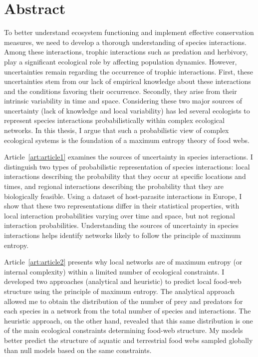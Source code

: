\documentclass[12pt,twoside,phd]{dms}
\numberwithin{equation}{section}
\numberwithin{table}{chapter}
\numberwithin{figure}{chapter}
\begin{document}
\anglais
\chapter*{Abstract}

To better understand ecosystem functioning and implement effective conservation
measures, we need to develop a thorough understanding of species
interactions. Among these interactions, trophic interactions such as predation
and herbivory, play a significant ecological role by affecting
population dynamics. However, uncertainties remain regarding the occurrence of
trophic interactions. First, these uncertainties stem from our lack of empirical
knowledge about these interactions and the conditions favoring their occurrence.
Secondly, they arise from their intrinsic variability in time and space.
Considering these two major sources of uncertainty (lack of knowledge and local
variability) has led several ecologists to represent species interactions
probabilistically within complex ecological networks. In this thesis, I argue
that such a probabilistic view of complex ecological systems is the foundation
of a maximum entropy theory of food webs.

Article~\ref{art:article1} examines the sources of uncertainty in species
interactions. I distinguish two types of probabilistic representation of species
interactions: local interactions describing the probability that they occur at
specific locations and times, and regional interactions describing the
probability that they are biologically feasible. Using a dataset of
host-parasite interactions in Europe, I show that these two representations
differ in their statistical properties, with local interaction probabilities
varying over time and space, but not regional interaction probabilities.
Understanding the sources of uncertainty in species interactions helps identify
networks likely to follow the principle of maximum entropy.

Article~\ref{art:article2} presents why local networks are of maximum entropy
(or internal complexity) within a limited number of ecological constraints. I
developed two approaches (analytical and heuristic) to predict local food-web
structure using the principle of maximum entropy. The analytical approach
allowed me to obtain the distribution of the number of prey and predators for
each species in a network from the total number of species and interactions. The
heuristic approach, on the other hand, revealed that this same distribution is
one of the main ecological constraints determining food-web structure. My models
better predict the structure of aquatic and terrestrial food webs sampled
globally than null models based on the same constraints.
\end{document}
